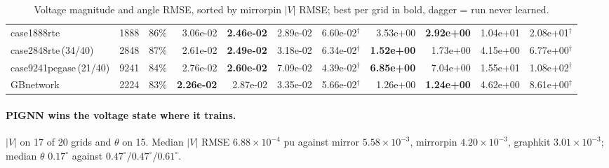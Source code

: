 \documentclass[10pt]{article}
\begin{document}
\begin{landscape}
\begin{table}[H]
\begin{tabular}{lrr rrrr rrrr}
case1888rte & 1888 & 86\% & 3.06e-02 & \textbf{2.46e-02} & 2.89e-02 & 6.60e-02$^\dagger$ & 3.53e+00 & \textbf{2.92e+00} & 1.04e+01 & 2.08e+01$^\dagger$ \\
case2848rte\,(34/40) & 2848 & 87\% & 2.61e-02 & \textbf{2.49e-02} & 3.18e-02 & 6.34e-02$^\dagger$ & \textbf{1.52e+00} & 1.73e+00 & 4.15e+00 & 6.77e+00$^\dagger$ \\
case9241pegase\,(21/40) & 9241 & 84\% & 2.76e-02 & \textbf{2.60e-02} & 7.09e-02 & 4.39e-02$^\dagger$ & \textbf{6.85e+00} & 7.04e+00 & 1.55e+01 & 1.08e+02$^\dagger$ \\
GBnetwork & 2224 & 83\% & \textbf{2.26e-02} & 2.87e-02 & 3.35e-02 & 5.66e-02$^\dagger$ & 1.26e+00 & \textbf{1.24e+00} & 4.62e+00 & 8.61e+00$^\dagger$ \\
\bottomrule
\end{tabular}
\caption{Voltage magnitude and angle RMSE, sorted by mirrorpin $|V|$ RMSE; best per grid in bold, dagger = run never learned.}
\end{table}
\end{landscape}

\paragraph{PIGNN wins the voltage state where it trains.} $|V|$ on 17 of 20
grids and $\theta$ on 15. Median $|V|$ RMSE $6.88\times10^{-4}$ pu against
mirror $5.58\times10^{-3}$, mirrorpin $4.20\times10^{-3}$, graphkit
$3.01\times10^{-3}$; median $\theta$ $0.17^\circ$ against
$0.47^\circ$/$0.47^\circ$/$0.61^\circ$.
\end{document}
